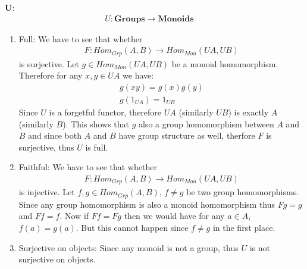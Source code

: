 \textbf{U}:
    \begin{gather*}
        U: \textbf{Groups} \to \textbf{Monoids} \phantom{sal}
    \end{gather*}
    \begin{center}
    \end{center}
    \begin{enumerate}[label=\ilabel]
        \item 
            Full: We have to see that whether 
            \begin{gather*}
                F: Hom_{Grp}(A, B) \to Hom_{Mon} (UA, UB)
            \end{gather*}
            is surjective. Let $g \in Hom_{Mon}(UA, UB)$ be a monoid homomorphism. Therefore for any $x, y \in UA$ we have:
            \begin{gather*}
                g(xy) = g(x) g(y) \\
                g(1_{UA}) = 1_{UB}
            \end{gather*}
            Since $U$ is a forgetful functor, therefore $UA$ (similarly $UB$) is exactly $A$ (similarly $B$). This shows that $g$ also a group homomorphism between $A$ and $B$ and since both $A$ and $B$ have group structure as well, therfore $F$ is surjective, thus $U$ is full.
        \item 
            Faithful: We have to see that whether 
            \begin{gather*}
                F: Hom_{Grp}(A, B) \to Hom_{Mon}(UA, UB)
            \end{gather*}
            is injective. Let $f, g \in Hom_{Grp}(A, B)$, $f \ne g$ be two group homomorphisms. Since any group homomorphism is also a monoid homomorphism thus $Fg = g$ and $Ff = f$. Now if $Ff = Fg$ then we would have for any $a \in A$, $f(a) = g(a)$. But this cannot happen since $f \ne g$ in the first place.
        \item 
            Surjective on objects: Since any monoid is not a group, thus $U$ is not surjective on objects.
        

\end{enumerate}
